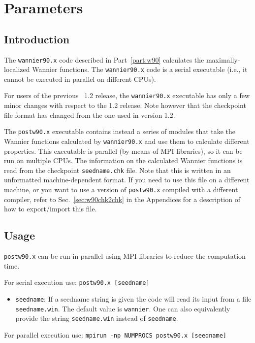 \chapter{Parameters}

\section{Introduction}

The \texttt{wannier90.x} code described in Part~\ref{part:w90}
calculates the maximally-localized Wannier functions. The \texttt{wannier90.x} code is a
serial executable (i.e., it cannot be executed in parallel on different
CPUs).

For users of the previous \wannier\ 1.2 release, the
\texttt{wannier90.x} executable has only a few minor changes with
respect to the 1.2 release. Note however that the checkpoint file format has
changed from the one used in version 1.2.

The \texttt{postw90.x} executable contains instead a series of modules
that take the Wannier functions calculated by \texttt{wannier90.x} and
use them to calculate different properties.  This executable is
parallel (by means of MPI libraries), so it can be run on multiple
CPUs.  The information on the calculated Wannier functions is read
from the checkpoint \verb|seedname.chk| file. Note that this is
written in an unformatted machine-dependent format. If you need to use
this file on a different machine, or you want to use a version of
\texttt{postw90.x} compiled with a different compiler, refer to
Sec.~\ref{sec:w90chk2chk} in the Appendices for a description of how
to export/import this file. 

\section{Usage}
{\tt postw90.x} can be run in parallel using MPI libraries to
reduce the computation time.

For serial execution use: {\tt postw90.x [seedname]} 

\begin{itemize} \item 
{\tt seedname}: If a seedname string is given the code
will read its input from a file {\tt seedname.win}. The default
  value is {\tt wannier}. One can also equivalently provide the string
  {\tt seedname.win} instead of  {\tt seedname}.
\end{itemize}

For parallel execution use: {\tt mpirun -np NUMPROCS postw90.x [seedname]}

